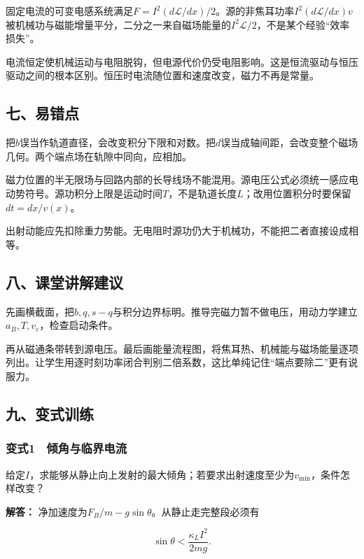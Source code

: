 \documentclass[12pt,a4paper,fontset=fandol]{ctexart}
\begin{document}
固定电流的可变电感系统满足\(F=I^2(d\mathcal L/dx)/2\)。源的非焦耳功率\(I^2(d\mathcal L/dx)v\)被机械功与磁能增量平分，二分之一来自磁场能量的\(I^2\mathcal L/2\)，不是某个经验``效率损失''。

电流恒定使机械运动与电阻脱钩，但电源代价仍受电阻影响。这是恒流驱动与恒压驱动之间的根本区别。恒压时电流随位置和速度改变，磁力不再是常量。

\subsection{七、易错点}\label{ux4e03ux6613ux9519ux70b9-2}

把\(b\)误当作轨道直径，会改变积分下限和对数。把\(d\)误当成轴间距，会改变整个磁场几何。两个端点场在轨隙中同向，应相加。

磁力位置的半无限场与回路内部的长导线场不能混用。源电压公式必须统一感应电动势符号。源功积分上限是运动时间\(T\)，不是轨道长度\(L\)；改用位置积分时要保留\(dt=dx/v(x)\)。

出射动能应先扣除重力势能。无电阻时源功仍大于机械功，不能把二者直接设成相等。

\subsection{八、课堂讲解建议}\label{ux516bux8bfeux5802ux8bb2ux89e3ux5efaux8bae-2}

先画横截面，把\(b,q,s-q\)与积分边界标明。推导完磁力暂不做电压，用动力学建立\(a_B,T,v_e\)，检查启动条件。

再从磁通条带转到源电压。最后画能量流程图，将焦耳热、机械能与磁场能量逐项列出。让学生用逐时刻功率闭合判别二倍系数，这比单纯记住``端点要除二''更有说服力。

\subsection{九、变式训练}\label{ux4e5dux53d8ux5f0fux8badux7ec3-2}

\subsubsection{变式1　倾角与临界电流}\label{ux53d8ux5f0f1-ux503eux89d2ux4e0eux4e34ux754cux7535ux6d41}

给定\(I\)，求能够从静止向上发射的最大倾角；若要求出射速度至少为\(v_{\min}\)，条件怎样改变？

\textbf{解答：} 净加速度为\(F_B/m-g\sin\theta\)。从静止走完整段必须有

\[
\sin\theta<\frac{\kappa_LI^2}{2mg}.
\]
\end{document}
